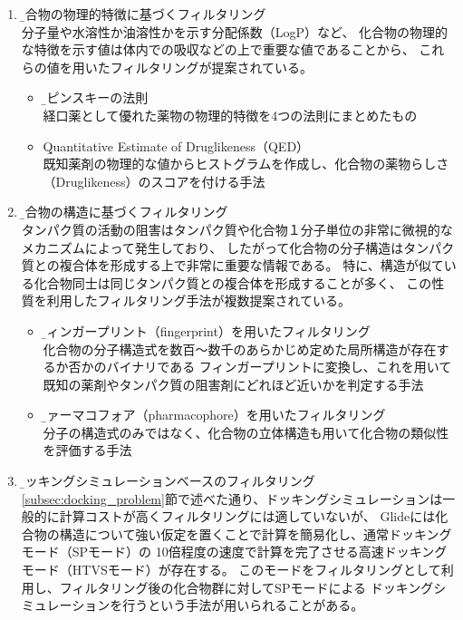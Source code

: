 \begin{enumerate}
\item \b{化合物の物理的特徴に基づくフィルタリング}\\
	分子量や水溶性か油溶性かを示す分配係数（LogP）など、
	化合物の物理的な特徴を示す値は体内での吸収などの上で重要な値であることから、
	これらの値を用いたフィルタリングが提案されている。
	\begin{itemize}
	\item \b{リピンスキーの法則\cite{Lipinski1997}}\\
		経口薬として優れた薬物の物理的特徴を4つの法則にまとめたもの
	\item \b{Quantitative Estimate of Druglikeness（QED）\cite{Bickerton2012}}\\
		既知薬剤の物理的な値からヒストグラムを作成し、化合物の薬物らしさ（Druglikeness）のスコアを付ける手法
	\end{itemize}
\item \b{化合物の構造に基づくフィルタリング}\\
	タンパク質の活動の阻害はタンパク質や化合物１分子単位の非常に微視的なメカニズムによって発生しており、
	したがって化合物の分子構造はタンパク質との複合体を形成する上で非常に重要な情報である。
	特に、構造が似ている化合物同士は同じタンパク質との複合体を形成することが多く、
	この性質を利用したフィルタリング手法が複数提案されている。
	\begin{itemize}
	\item \b{フィンガープリント（fingerprint）を用いたフィルタリング\cite{Nilakantan1993}}\\
		化合物の分子構造式を数百～数千のあらかじめ定めた局所構造が存在するか否かのバイナリである
		フィンガープリントに変換し、これを用いて既知の薬剤やタンパク質の阻害剤にどれほど近いかを判定する手法
	\item \b{ファーマコフォア（pharmacophore）を用いたフィルタリング\cite{Parenti2003}}\\
		分子の構造式のみではなく、化合物の立体構造も用いて化合物の類似性を評価する手法
	\end{itemize}
\item \b{ドッキングシミュレーションベースのフィルタリング}\\
	\ref{subsec:docking_problem}節で述べた通り、ドッキングシミュレーションは一般的に計算コストが高くフィルタリングには適していないが、
	Glideには化合物の構造について強い仮定を置くことで計算を簡易化し、通常ドッキングモード（SPモード）の
	10倍程度の速度\cite{GlideHomePage}で計算を完了させる高速ドッキングモード（HTVSモード）が存在する。
	このモードをフィルタリングとして利用し、フィルタリング後の化合物群に対してSPモードによる
	ドッキングシミュレーションを行うという手法が用いられることがある\cite{Fujimoto2008}。
\end{enumerate}

